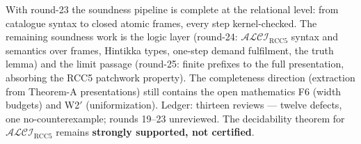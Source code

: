 \documentclass[11pt]{article}
\newcommand{\ALCIRCC}{\mathcal{ALCI}_{\mathrm{RCC5}}}
\begin{document}
With round-23 the soundness pipeline is complete at the relational
level: from catalogue syntax to closed atomic frames, every step
kernel-checked.  The remaining soundness work is the logic layer
(round-24: $\ALCIRCC$ syntax and semantics over frames, Hintikka
types, one-step demand fulfilment, the truth lemma) and the limit
passage (round-25: finite prefixes to the full presentation, absorbing
the RCC5 patchwork property).  The completeness direction (extraction
from Theorem-A presentations) still contains the open mathematics F6
(width budgets) and W2$'$ (uniformization).  Ledger: thirteen reviews
--- twelve defects, one no-counterexample; rounds 19--23 unreviewed.
The decidability theorem for $\ALCIRCC$ remains \textbf{strongly
supported, not certified}.
\end{document}
